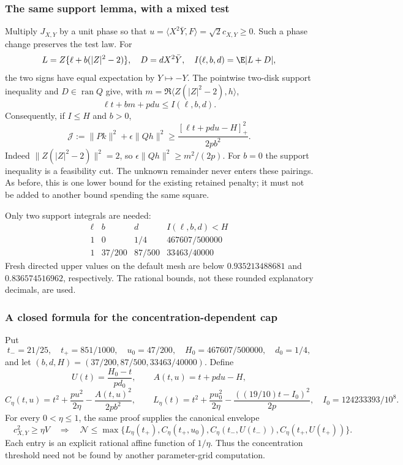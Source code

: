\subsubsection{The same support lemma, with a mixed test}
Multiply $J_{X,Y}$ by a unit phase so that
$u=\langle X^2\bar Y,F\rangle=\sqrt2c_{X,Y}\ge0$.
Such a phase change preserves the test law. For
\[
 L=Z\{\ell+b(|Z|^2-2)\},\quad D=dX^2\bar Y,\quad
 I(\ell,b,d)=\E|L+D|,
\]
the two signs have equal expectation by $Y\mapsto-Y$.
The pointwise two-disk support inequality and $D\in\operatorname{ran}Q$
give, with $m=\Re\langle Z(|Z|^2-2),h\rangle$,
\[
 \ell t+bm+pdu\le I(\ell,b,d).
\]
Consequently, if $I\le H$ and $b>0$,
\begin{equation}\label{eq:mixed-contact-penalty}
 \mathcal J:=\|Pk\|^2+\epsilon\|Qh\|^2
 \ge\frac{[\ell t+pdu-H]_+^2}{2pb^2}.
\end{equation}
Indeed $\|Z(|Z|^2-2)\|^2=2$, so
$\epsilon\|Qh\|^2\ge m^2/(2p)$.
For $b=0$ the support inequality is a feasibility cut.
The unknown remainder never enters these pairings.
As before, this is one lower bound for the existing retained penalty;
it must not be added to another bound spending the same square.

Only two support integrals are needed:
\[
\begin{array}{c|c|c|c}
 \ell&b&d&I(\ell,b,d)<H\\\hline
 1&0&1/4&467607/500000\\
 1&37/200&87/500&33463/40000
\end{array}
\]
Fresh directed upper values on the default mesh are below
$0.935213488681$ and $0.836574516962$, respectively.
The rational bounds, not these rounded explanatory decimals, are used.

\subsubsection{A closed formula for the concentration-dependent cap}
Put
\[
 t_-=21/25,\quad t_+=851/1000,\quad u_0=47/200,\quad
 H_0=467607/500000,\quad d_0=1/4,
\]
and let $(b,d,H)=(37/200,87/500,33463/40000)$. Define
\[
 U(t)=\frac{H_0-t}{pd_0},\qquad
 A(t,u)=t+pdu-H,
\]
\[
 C_\eta(t,u)=t^2+\frac{pu^2}{2\eta}
                   -\frac{A(t,u)^2}{2pb^2},\qquad
 L_\eta(t)=t^2+\frac{pu_0^2}{2\eta}
                   -\frac{((19/10)t-I_0)^2}{2p},
 \quad I_0=124233393/10^8.
\]
For every $0<\eta\le1$, the same proof supplies the canonical envelope
\begin{equation}\label{eq:mixed-contact-canonical-cap}
 \boxed{\quad c_{X,Y}^2\ge\eta V\quad\Longrightarrow\quad
 \mathcal N\le\max\{L_\eta(t_+),C_\eta(t_+,u_0),
                  C_\eta(t_-,U(t_-)),C_\eta(t_+,U(t_+))\}.\quad}
\end{equation}
Each entry is an explicit rational affine function of $1/\eta$.
Thus the concentration threshold need not be found by another
parameter-grid computation.

